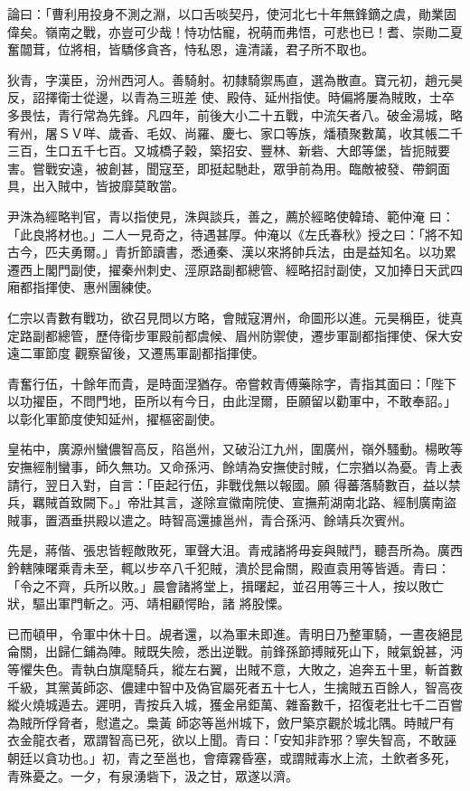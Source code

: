 \begin{pinyinscope}
 論曰：「曹利用投身不測之淵，以口舌啖契丹，使河北七十年無鋒鏑之虞，勛業固偉矣。嶺南之戰，亦豈可少哉！恃功怙寵，祝萌而弗悟，可悲也已！耆、崇勛二夏奮闒茸，位將相，皆驕侈貪吝，恃私恩，違清議，君子所不取也。



 狄青，字漢臣，汾州西河人。善騎射。初隸騎禦馬直，選為散直。寶元初，趙元昊反，詔擇衛士從邊，以青為三班差
 使、殿侍、延州指使。時偏將屢為賊敗，士卒多畏怯，青行常為先鋒。凡四年，前後大小二十五戰，中流矢者八。破金湯城，略宥州，屠ＳＶ咩、歲香、毛奴、尚羅、慶七、家口等族，燔積聚數萬，收其帳二千三百，生口五千七百。又城橋子穀，築招安、豐林、新砦、大郎等堡，皆扼賊要害。嘗戰安遠，被創甚，聞寇至，即挺起馳赴，眾爭前為用。臨敵被發、帶銅面具，出入賊中，皆披靡莫敢當。



 尹洙為經略判官，青以指使見，洙與談兵，善之，薦於經略使韓琦、範仲淹
 曰：「此良將材也。」二人一見奇之，待遇甚厚。仲淹以《左氏春秋》授之曰：「將不知古今，匹夫勇爾。」青折節讀書，悉通秦、漢以來將帥兵法，由是益知名。以功累遷西上閣門副使，擢秦州刺史、涇原路副都總管、經略招討副使，又加捧日天武四廂都指揮使、惠州團練使。



 仁宗以青數有戰功，欲召見問以方略，會賊寇渭州，命圖形以進。元昊稱臣，徙真定路副都總管，歷侍衛步軍殿前都虞候、眉州防禦使，遷步軍副都指揮使、保大安遠二軍節度
 觀察留後，又遷馬軍副都指揮使。



 青奮行伍，十餘年而貴，是時面涅猶存。帝嘗敕青傅藥除字，青指其面曰：「陛下以功擢臣，不問門地，臣所以有今日，由此涅爾，臣願留以勸軍中，不敢奉詔。」以彰化軍節度使知延州，擢樞密副使。



 皇祐中，廣源州蠻儂智高反，陷邕州，又破沿江九州，圍廣州，嶺外騷動。楊畋等安撫經制蠻事，師久無功。又命孫沔、餘靖為安撫使討賊，仁宗猶以為憂。青上表請行，翌日入對，自言：「臣起行伍，非戰伐無以報國。願
 得蕃落騎數百，益以禁兵，羈賊首致闕下。」帝壯其言，遂除宣徽南院使、宣撫荊湖南北路、經制廣南盜賊事，置酒垂拱殿以遣之。時智高還據邕州，青合孫沔、餘靖兵次賓州。



 先是，蔣偕、張忠皆輕敵敗死，軍聲大沮。青戒諸將毋妄與賊鬥，聽吾所為。廣西鈐轄陳曙乘青未至，輒以步卒八千犯賊，潰於昆侖關，殿直袁用等皆遁。青曰：「令之不齊，兵所以敗。」晨會諸將堂上，揖曙起，並召用等三十人，按以敗亡狀，驅出軍門斬之。沔、靖相顧愕眙，諸
 將股慄。



 已而頓甲，令軍中休十日。覘者還，以為軍未即進。青明日乃整軍騎，一晝夜絕昆侖關，出歸仁鋪為陣。賊既失險，悉出逆戰。前鋒孫節搏賊死山下，賊氣銳甚，沔等懼失色。青執白旗麾騎兵，縱左右翼，出賊不意，大敗之，追奔五十里，斬首數千級，其黨黃師宓、儂建中智中及偽官屬死者五十七人，生擒賊五百餘人，智高夜縱火燒城遁去。遲明，青按兵入城，獲金帛鉅萬、雜畜數千，招復老壯七千二百嘗為賊所俘脅者，慰遣之。梟黃
 師宓等邕州城下，斂尸築京觀於城北隅。時賊尸有衣金龍衣者，眾謂智高已死，欲以上聞。青曰：「安知非詐邪？寧失智高，不敢誣朝廷以貪功也。」初，青之至邕也，會瘴霧昏塞，或謂賊毒水上流，土飲者多死，青殊憂之。一夕，有泉湧砦下，汲之甘，眾遂以濟。




\end{pinyinscope}
